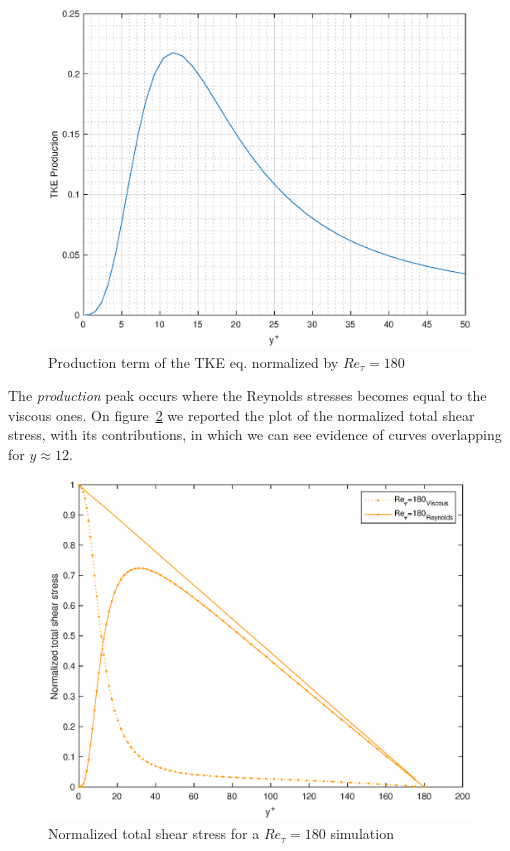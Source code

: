 \begin{figure}
\begin{center}
\includegraphics[scale=0.55]{grafici/tke_prod_180.eps}
\caption{Production term of the TKE eq. normalized by $Re_{\tau}=180$}
\label{tke:prod:180}
\end{center} 
\end{figure}

The \emph{production} peak occurs where the Reynolds stresses becomes equal to the viscous ones.
On figure~\ref{stresses:180} we reported the plot of the normalized total shear stress, with its contributions, in which we can see evidence of curves overlapping for $y\approx 12$.\par


\begin{figure}
\begin{center}
\includegraphics[scale=0.55]{grafici/stresses_180.eps}
\caption{Normalized total shear stress for a $Re_{\tau}=180$ simulation}
\label{stresses:180}
\end{center} 
\end{figure}